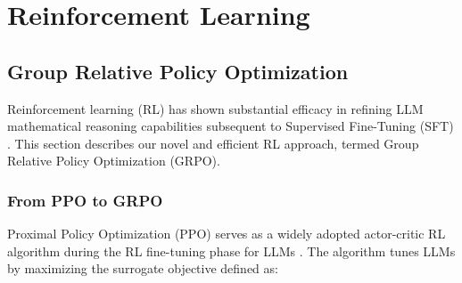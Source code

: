 \section{Reinforcement Learning}

\subsection{Group Relative Policy Optimization}
Reinforcement learning (RL) has shown substantial efficacy in refining LLM mathematical reasoning capabilities subsequent to Supervised Fine-Tuning (SFT) \citep{wang2023math,wizardmath}. This section describes our novel and efficient RL approach, termed Group Relative Policy Optimization (GRPO).

\subsubsection{From PPO to GRPO}
Proximal Policy Optimization (PPO) \citep{schulman2017proximal} serves as a widely adopted actor-critic RL algorithm during the RL fine-tuning phase for LLMs \citep{ouyang2022training}. The algorithm tunes LLMs by maximizing the surrogate objective defined as:

